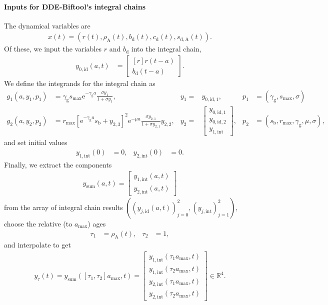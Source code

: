 \documentclass[11pt]{scrartcl}
\newcommand{\R}{\mathbb{R}}
\newcommand{\e}{\mathrm{e}}
\newcommand{\bd}{b_\mathrm{d}}
\newcommand{\cd}{c_\mathrm{d}}
\newcommand{\rmax}{r_\mathrm{max}}
\newcommand{\amax}{{a_\mathrm{max}}}
\newcommand{\szmax}{{s_\mathrm{max}}}
\newcommand{\sda}{s_\mathrm{d,A}}
\newcommand{\szb}{s_\mathrm{b}}
\newcommand{\ra}{\rho_\mathrm{A}}
\newcommand{\id}{\mathrm{id}}
\newcommand{\indint}{\mathrm{int}}
\renewcommand{\gg}{\gamma_\mathrm{g}}
\begin{document}
\paragraph{Inputs for DDE-Biftool's integral chains}
The dynamical variables are
\begin{align*}
  x(t)=(r(t),\ra(t),\bd(t),\cd(t),\sda(t)).
\end{align*}
Of these, we input the variables $r$ and $\bd$ into the integral chain,
\begin{align*}
  y_{0,\id}(a,t)&=
  \begin{bmatrix*}[r]
    r(t-a)\\
    \bd(t-a)
  \end{bmatrix*}.
\end{align*}
We define the integrands for the integral chain as
\begin{align*}
  g_1(a,y_1,p_1)&=\gg\szmax\e^{-\gg a}\frac{\sigma y_1}{1+\sigma y_1},&y_1=&y_{0,\id,1},&p_1&=(\gg,\szmax,\sigma)\\
  g_2(a,y_2,p_2)&=\rmax \left[\e^{-\gg a}\szb+y_{2,3}\right]^2\e^{-\mu a}\frac{\sigma y_{2,1}}{1+\sigma y_{2,1}}y_{2,2},&y_2=&
  \begin{bmatrix}
    y_{0,\id,1}\\
    y_{0,\id,2}\\
    y_{1,\indint}    
\end{bmatrix}, &p_2&=(\szb,\rmax,\gg,\mu,\sigma),
\end{align*}
and set initial values
\begin{align*}
  y_{1,\indint}(0)&=0,&y_{2,\indint}(0)&=0.
\end{align*}
Finally, we extract the components
\begin{align*}
  y_\mathrm{sum}(a,t)=
  \begin{bmatrix}
    y_{1,\indint}(a,t)\\
    y_{2,\indint}(a,t)
  \end{bmatrix}
\end{align*}
from the array of integral chain results $((y_{j,\id}(a,t))_{j=0}^2,(y_{j,\indint})_{j=1}^2)$, choose the relative (to $\amax$) ages
\begin{align*}
  \tau_1&=\ra(t),&\tau_2&=1,
\end{align*}
and interpolate to get
\begin{align*}
  y_\tau(t)=    y_\mathrm{sum}([\tau_1,\tau_2]\amax,t)=
\begin{bmatrix}
    y_{1,\indint}(\tau_1\amax,t)\\
    y_{1,\indint}(\tau_2\amax,t)\\
    y_{2,\indint}(\tau_1\amax,t)\\
    y_{2,\indint}(\tau_2\amax,t)
  \end{bmatrix}\in\R^4.  
\end{align*}
\end{document}

